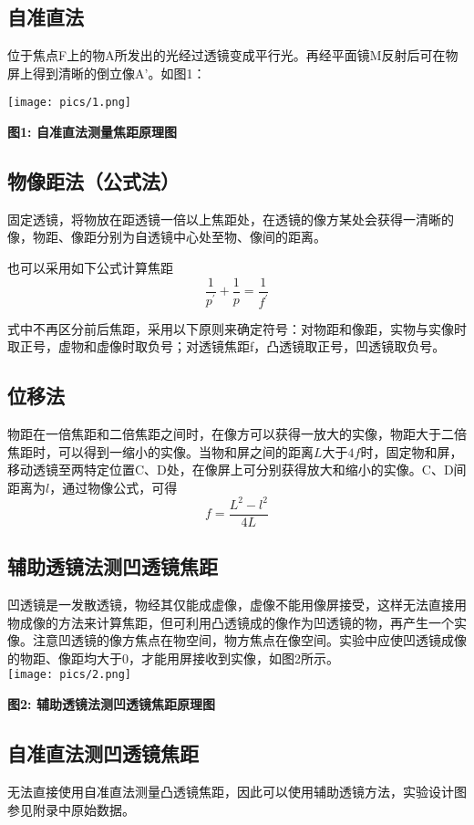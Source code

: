 \documentclass[10pt,a4paper]{article}	%
\makeatletter
\newenvironment{figurehere}
{\def\@captype{figure}}
{}
\makeatother
\begin{document}
	\subsection{自准直法}
		位于焦点F上的物A所发出的光经过透镜变成平行光。再经平面镜M反射后可在物屏上得到清晰的倒立像A'。如图1：
		
		\begin{figurehere}
			\centering
			\texttt{[image: pics/1.png]}
			\caption*{\bf 图1: 自准直法测量焦距原理图}
		\end{figurehere}
	\subsection{物像距法（公式法）}
		固定透镜，将物放在距透镜一倍以上焦距处，在透镜的像方某处会获得一清晰的像，物距、像距分别为自透镜中心处至物、像间的距离。
		
		也可以采用如下公式计算焦距
		\[
		\frac{1}{p^{\prime}}+\frac{1}{p}=\frac{1}{f^{\prime}} \tag{3}
		\]
		
		式中不再区分前后焦距，采用以下原则来确定符号：对物距和像距，实物与实像时取正号，虚物和虚像时取负号；对透镜焦距f，凸透镜取正号，凹透镜取负号。
	\subsection{位移法}
		物距在一倍焦距和二倍焦距之间时，在像方可以获得一放大的实像，物距大于二倍焦距时，可以得到一缩小的实像。当物和屏之间的距离$L$大于$4f$时，固定物和屏，移动透镜至两特定位置C、D处，在像屏上可分别获得放大和缩小的实像。C、D间距离为$l$，通过物像公式，可得
		\[
			f=\frac{L^2-l^2}{4 L} \tag{4}
		\]
	\subsection{辅助透镜法测凹透镜焦距}
		凹透镜是一发散透镜，物经其仅能成虚像，虚像不能用像屏接受，这样无法直接用物成像的方法来计算焦距，但可利用凸透镜成的像作为凹透镜的物，再产生一个实像。注意凹透镜的像方焦点在物空间，物方焦点在像空间。实验中应使凹透镜成像的物距、像距均大于0，才能用屏接收到实像，如图2所示。\\

		\begin{figurehere}
			\centering
			\texttt{[image: pics/2.png]}
			\caption*{\bf 图2: 辅助透镜法测凹透镜焦距原理图}
		\end{figurehere}

	\subsection{自准直法测凹透镜焦距}
		无法直接使用自准直法测量凸透镜焦距，因此可以使用辅助透镜方法，实验设计图参见附录中原始数据。
\end{document}
